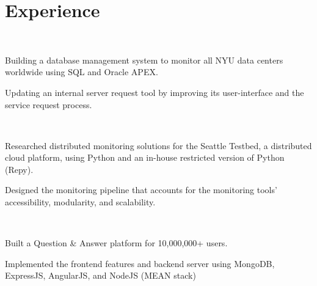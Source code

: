 \documentclass[]{hieudo-build}
\begin{document}
\hfill
\begin{minipage}[t]{0.65\textwidth} 

\section{Experience}

\\
\vspace{0.9em} %
\begin{tightemize}
\item Building a database management system to monitor all NYU data centers worldwide using SQL and Oracle APEX.
\item Updating an internal server request tool by improving its user-interface and the service request process.
\end{tightemize}
\sectionsep

 \\
\begin{tightemize}
\item Researched distributed monitoring solutions for the Seattle Testbed, a distributed cloud platform, using Python and an in-house restricted version of Python (Repy).
\item Designed the monitoring pipeline that accounts for the monitoring tools' accessibility, modularity, and scalability.
\end{tightemize}
\sectionsep

 \\
\begin{tightemize}
\item Built a Question \& Answer platform for 10,000,000+ users.
\item Implemented the frontend features and backend server using MongoDB, ExpressJS, AngularJS, and NodeJS (MEAN stack)
\end{tightemize}
\sectionsep


\end{minipage}
\end{document}
